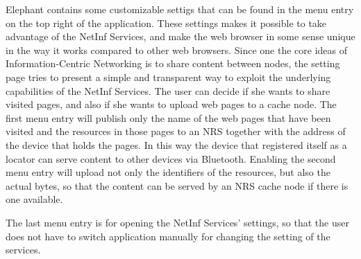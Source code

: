 Elephant contains some customizable settigs that can be found in the menu entry on the top right of the application.
These settings makes it possible to take advantage of the NetInf Services, and make the web browser in some sense
unique in the way it works compared to other web browsers.
Since one the core ideas of Information-Centric Networking is to share content between nodes, the setting page
tries to present a simple and transparent way to exploit the underlying capabilities of the NetInf Services.
The user can decide if she wants to share visited pages, and also if she wants to upload web pages to a cache node.
The first menu entry will publish only the name of the web pages that have been visited and the resources in those
pages to an NRS together with the address of the device that holds the pages. In this way the device that registered
itself as a locator can serve content to other devices via Bluetooth.
Enabling the second menu entry will upload not only the identifiers of the resources, but also the actual bytes,
so that the content can be served by an NRS cache node if there is one available.

The last menu entry is for opening the NetInf Services' settings, so that the user does not have to switch application
manually for changing the setting of the services. \\

